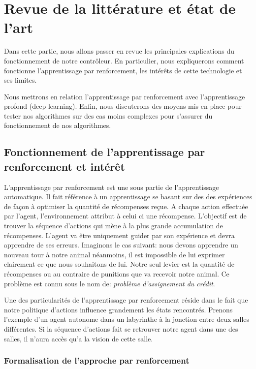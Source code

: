 \newpage
\section{Revue de la littérature et état de l'art}

Dans cette partie, nous allons passer en revue les principales explications du fonctionnement de notre contrôleur. 
En particulier, nous expliquerons comment fonctionne l'apprentissage par renforcement, les intérêts de cette technologie et ses limites.  

Nous mettrons en relation l'apprentissage par renforcement avec l'apprentissage profond (deep learning).
Enfin, nous discuterons des moyens mis en place pour tester nos algorithmes sur des cas moins complexes pour s'assurer du fonctionnement de nos algorithmes.

\subsection{Fonctionnement de l'apprentissage par renforcement et intérêt}

L'apprentissage par renforcement est une sous partie de l'apprentissage automatique. Il fait référence à un apprentissage se basant sur des des expériences de façon à optimiser la quantité de récompenses reçue. A chaque action effectuée par l'agent, l'environnement attribut à celui ci une récompense. L'objectif est de trouver la séquence d'actions qui mène à la plus grande accumulation de récompenses. L'agent va être uniquement guider par son expérience et devra apprendre de ses erreurs. Imaginons le cas suivant: nous devons apprendre un nouveau tour à notre animal néanmoins, il est impossible de lui exprimer clairement ce que nous souhaitons de lui. Notre seul levier est la quantité de récompenses ou au contraire de punitions que va recevoir notre animal. Ce problème est connu sous le nom de: \emph{problème d'assignement du crédit}. 

Une des particularités de l'apprentissage par renforcement réside dans le fait que notre politique d'actions influence grandement les états rencontrés. Prenons l'exemple d'un agent autonome dans un labyrinthe à la jonction entre deux salles différentes. Si la séquence d'actions fait se retrouver notre agent dans une des salles, il n'aura accès qu'a la vision de cette salle.

\subsubsection{Formalisation de l'approche par renforcement}

